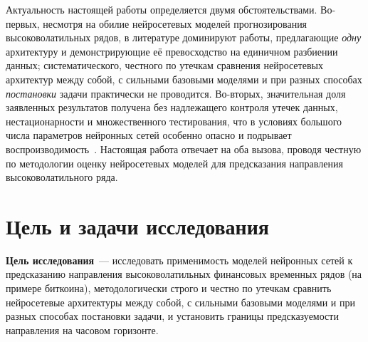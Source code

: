 \documentclass[12pt,a4paper]{report}
\begin{document}
Актуальность настоящей работы определяется двумя обстоятельствами. Во-первых,
несмотря на обилие нейросетевых моделей прогнозирования высоковолатильных рядов, в
литературе доминируют работы, предлагающие \emph{одну} архитектуру и демонстрирующие
её превосходство на единичном разбиении данных; систематического, честного по
утечкам сравнения нейросетевых архитектур между собой, с сильными базовыми моделями
и при разных способах \emph{постановки} задачи практически не проводится.
Во-вторых, значительная доля заявленных результатов получена без надлежащего
контроля утечек данных, нестационарности и множественного тестирования, что в
условиях большого числа параметров нейронных сетей особенно опасно и подрывает
воспроизводимость~\cite{lopez2018}. Настоящая работа отвечает на оба вызова,
проводя честную по методологии оценку нейросетевых моделей для предсказания
направления высоковолатильного ряда.

\section*{Цель и задачи исследования}

\textbf{Цель исследования}~--- исследовать применимость моделей нейронных сетей к
предсказанию направления высоковолатильных финансовых временных рядов (на примере
биткоина), методологически строго и честно по утечкам сравнить нейросетевые
архитектуры между собой, с сильными базовыми моделями и при разных способах
постановки задачи, и установить границы предсказуемости направления на часовом
горизонте.
\end{document}
